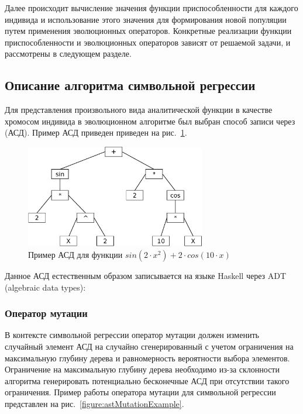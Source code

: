 Далее происходит вычисление значения функции приспособленности для каждого индивида и использование этого значения для формирования новой популяции путем применения эволюционных операторов. Конкретные реализации функции приспособленности и эволюционных операторов зависят от решаемой задачи, и рассмотрены в следующем разделе.

\clearpage
\subsection{Описание алгоритма символьной регрессии}

Для представления произвольного вида аналитической функции в качестве хромосом индивида в эволюционном алгоритме был выбран способ записи через  (АСД). Пример АСД приведен приведен на рис.~\ref{figure:astExample}.

\begin{figure}[h!]
\centering
\includegraphics[width=0.7\textwidth]{science/ast_example}
\caption{Пример АСД для функции $sin (2 \cdot x ^ 2) + 2 \cdot cos (10 \cdot x)$}
\label{figure:astExample}
\end{figure}

Данное АСД естественным образом записывается на языке Haskell через ADT (algebraic data types):


\subsubsection{Оператор мутации}

В контексте символьной регрессии оператор мутации должен изменить случайный элемент АСД на случайно сгенерированный с учетом ограничения на максимальную глубину дерева и равномерность вероятности выбора элементов. Ограничение на максимальную глубину дерева необходимо из-за склонности алгоритма генерировать потенциально бесконечные АСД при отсутствии такого ограничения. Пример работы оператора мутации для символьной регрессии представлен на рис.~\ref{figure:astMutationExample}.

